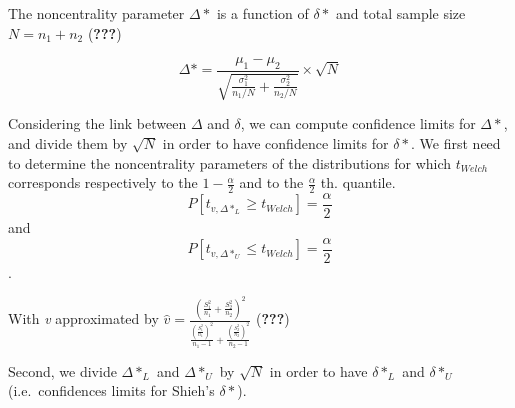 \documentclass[
  man,floatsintext]{apa6}
\begin{document}
The noncentrality parameter \(\Delta*\) is a function of \(\delta*\) and total sample size \(N = n_1 + n_2\) ({\textbf{???}})

\begin{equation}
\Delta* = \frac{\mu_1-\mu_2}{\sqrt{\frac{\sigma_1^2}{n_1/N}+\frac{\sigma_2^2}{n_2/N}}} \times \sqrt{N}
\label{eq:ncp}
\end{equation}

Considering the link between \(\Delta\) and \(\delta\), we can compute confidence limits for \(\Delta*\), and divide them by \(\sqrt{N}\) in order to have confidence limits for \(\delta*\). We first need to determine the noncentrality parameters of the distributions for which \(t_{Welch}\) corresponds respectively to the \(1-\frac{\alpha}{2}\) and to the \(\frac{\alpha}{2}\) th. quantile.
\[P[t_{v, \Delta*_L} \geq t_{Welch}] = \frac{\alpha}{2} \] and
\[P[t_{v, \Delta*_U} \leq t_{Welch}] = \frac{\alpha}{2} \].

With \emph{v} approximated by \(\hat{v} = \frac{(\frac{S_1^2}{n_1}+\frac{S_2^2}{n_2})^2}{\frac{(\frac{S_1^2}{n_1})^2}{n_1-1}+\frac{(\frac{S_2^2}{n_2})^2}{n_2-1}}\) ({\textbf{???}})

Second, we divide \(\Delta*_L\) and \(\Delta*_U\) by \(\sqrt{N}\) in order to have \(\delta*_L\) and \(\delta*_U\) (i.e.~confidences limits for Shieh's \(\delta*\)).
\end{document}
